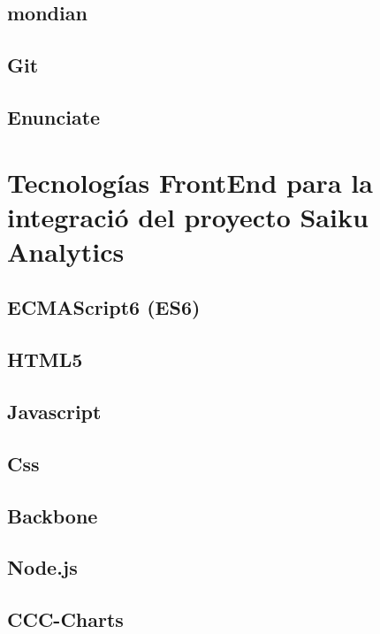 	\subsection{mondian}
	\subsection{Git}
	\subsection{Enunciate}
\section{Tecnolog\'{i}as FrontEnd para la integraci\'{o} del proyecto Saiku Analytics}
	\subsection{ECMAScript6 (ES6)}
	\subsection{HTML5}
	\subsection{Javascript}
	\subsection{Css}
	\subsection{Backbone}
	\subsection{Node.js}
	\subsection{CCC-Charts}

		
		
		
		
